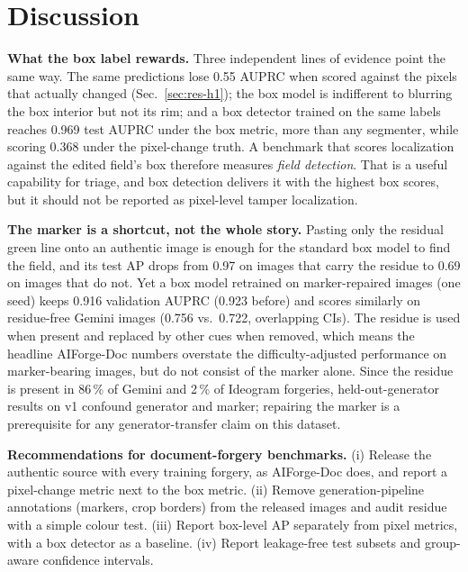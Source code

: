 \section{Discussion}
\label{sec:discussion}
\textbf{What the box label rewards.} Three independent lines of evidence point the same way. The same predictions lose 0.55 AUPRC when scored against the pixels that actually changed (Sec.~\ref{sec:res-h1}); the box model is indifferent to blurring the box interior but not its rim; and a box detector trained on the same labels reaches 0.969 test AUPRC under the box metric, more than any segmenter, while scoring 0.368 under the pixel-change truth. A benchmark that scores localization against the edited field's box therefore measures \emph{field detection}. That is a useful capability for triage, and box detection delivers it with the highest box scores, but it should not be reported as pixel-level tamper localization.

\textbf{The marker is a shortcut, not the whole story.} Pasting only the residual green line onto an authentic image is enough for the standard box model to find the field, and its test AP drops from 0.97 on images that carry the residue to 0.69 on images that do not. Yet a box model retrained on marker-repaired images (one seed) keeps 0.916 validation AUPRC (0.923 before) and scores similarly on residue-free Gemini images (0.756 vs.\ 0.722, overlapping CIs). The residue is used when present and replaced by other cues when removed, which means the headline AIForge-Doc numbers overstate the difficulty-adjusted performance on marker-bearing images, but do not consist of the marker alone. Since the residue is present in 86\,\% of Gemini and 2\,\% of Ideogram forgeries, held-out-generator results on v1 confound generator and marker; repairing the marker is a prerequisite for any generator-transfer claim on this dataset.

\textbf{Recommendations for document-forgery benchmarks.} (i) Release the authentic source with every training forgery, as AIForge-Doc does, and report a pixel-change metric next to the box metric. (ii) Remove generation-pipeline annotations (markers, crop borders) from the released images and audit residue with a simple colour test. (iii) Report box-level AP separately from pixel metrics, with a box detector as a baseline. (iv) Report leakage-free test subsets and group-aware confidence intervals.


